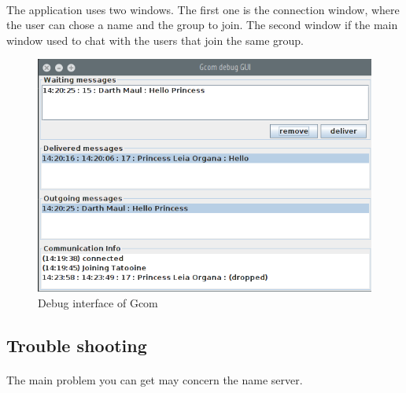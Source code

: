 \paragraph{}{
    The application uses two windows. The first one is the connection window, where
 the user can chose a name and the group to join. The second window if the main
 window used to chat with the users that join the same group.
}


	
\begin{figure}[h]
    \begin{center}
        \includegraphics[scale=0.5]{figures/debug_window.png}
    \end{center}
    \caption{Debug interface of Gcom}
    \label{fig:debugGui}
\end{figure}

\subsection{Trouble shooting}
\paragraph{}{
    The main problem you can get may concern the name server.
}

